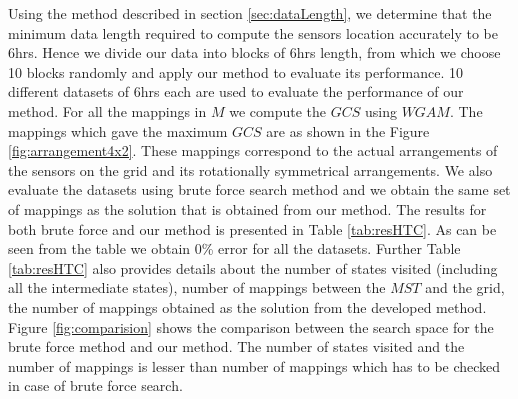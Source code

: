 Using the method described in section \ref{sec:dataLength}, we determine that the minimum data length required to compute the sensors location accurately to be 6hrs.
Hence we divide our data into blocks of 6hrs length, from which we choose 10 blocks randomly and apply our method to evaluate its performance.
10 different datasets of 6hrs each are used to evaluate the performance of our method.
For all the mappings in $M$ we compute the $GCS$ using $WGAM$. The mappings which gave the maximum $GCS$ are as shown in the Figure \ref{fig:arrangement4x2}.
These mappings correspond to the actual arrangements of the sensors on the grid and its rotationally symmetrical arrangements.
We also evaluate the datasets using brute force search method and we obtain the same set of mappings as the solution that is obtained from our method. The results for both brute force and our method is presented in Table \ref{tab:resHTC}.
As can be seen from the table we obtain 0\% error for all the datasets. 
Further Table \ref{tab:resHTC} also provides details about the number of states visited (including all the intermediate states), number of mappings between the $MST$ and the grid, the number of mappings obtained as the solution from the developed method. 
Figure \ref{fig:comparision} shows the comparison between the search space for the brute force method and our method. 
The number of states visited and the number of mappings is lesser than number of  mappings which has to be checked in case of brute force search. 
